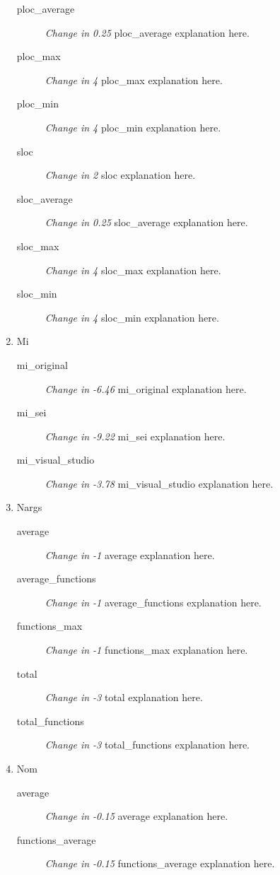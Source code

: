\begin{enumerate}
\begin{description}
          \item [ploc\_average] \textit{Change in 0.25} ploc\_average explanation here.
          \item [ploc\_max] \textit{Change in 4} ploc\_max explanation here.
          \item [ploc\_min] \textit{Change in 4} ploc\_min explanation here.
          \item [sloc] \textit{Change in 2} sloc explanation here.
          \item [sloc\_average] \textit{Change in 0.25} sloc\_average explanation here.
          \item [sloc\_max] \textit{Change in 4} sloc\_max explanation here.
          \item [sloc\_min] \textit{Change in 4} sloc\_min explanation here.
        \end{description}
  \item Mi
        \begin{description}
          \item [mi\_original] \textit{Change in -6.46} mi\_original explanation here.
          \item [mi\_sei] \textit{Change in -9.22} mi\_sei explanation here.
          \item [mi\_visual\_studio] \textit{Change in -3.78} mi\_visual\_studio explanation here.
        \end{description}
  \item Nargs
        \begin{description}
          \item [average] \textit{Change in -1} average explanation here.
          \item [average\_functions] \textit{Change in -1} average\_functions explanation here.
          \item [functions\_max] \textit{Change in -1} functions\_max explanation here.
          \item [total] \textit{Change in -3} total explanation here.
          \item [total\_functions] \textit{Change in -3} total\_functions explanation here.
        \end{description}
  \item Nom
        \begin{description}
          \item [average] \textit{Change in -0.15} average explanation here.
          \item [functions\_average] \textit{Change in -0.15} functions\_average explanation here.
        \end{description}
\end{enumerate}
